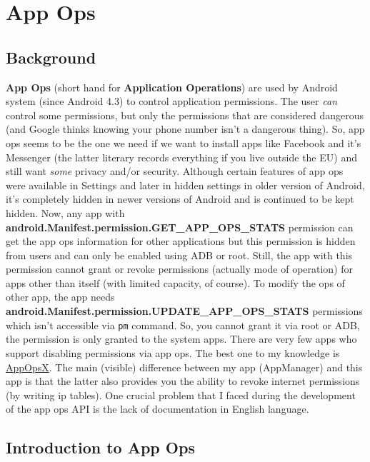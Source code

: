 \chapter{App Ops}\label{ch:app-ops}

\section{Background}\label{sec:app-ops-background}
\textbf{App Ops} (short hand for \textbf{Application Operations}) are used by Android system (since Android 4.3) to
control application permissions. The user \emph{can} control some permissions, but only the permissions that are considered
dangerous (and Google thinks knowing your phone number isn't a dangerous thing). So, app ops seems to be the one we need
if we want to install apps like Facebook and it's Messenger (the latter literary records everything if you live outside
the EU) and still want \emph{some} privacy and/or security. Although certain features of app ops were available in
Settings and later in hidden settings in older version of Android, it's completely hidden in newer versions of Android
and is continued to be kept hidden. Now, any app with \textbf{android.Manifest.permission.GET\_APP\_OPS\_STATS}
permission can get the app ops information for other applications but this permission is hidden from users and can only
be enabled using ADB or root. Still, the app with this permission cannot grant or revoke permissions (actually mode of
operation) for apps other than itself (with limited capacity, of course). To modify the ops of other app, the app needs
\textbf{android.Manifest.permission.UPDATE\_APP\_OPS\_STATS} permissions which isn't accessible via \texttt{pm} command.
So, you cannot grant it via root or ADB, the permission is only granted to the system apps. There are very few apps who
support disabling permissions via app ops. The best one to my knowledge is
\href{https://github.com/8enet/AppOpsX}{AppOpsX}. The main (visible) difference between my app (AppManager) and this
app is that the latter also provides you the ability to revoke internet permissions (by writing ip tables). One crucial
problem that I faced during the development of the app ops API is the lack of documentation in English language.


\section{Introduction to App Ops}\label{sec:introduction-to-app-ops}

